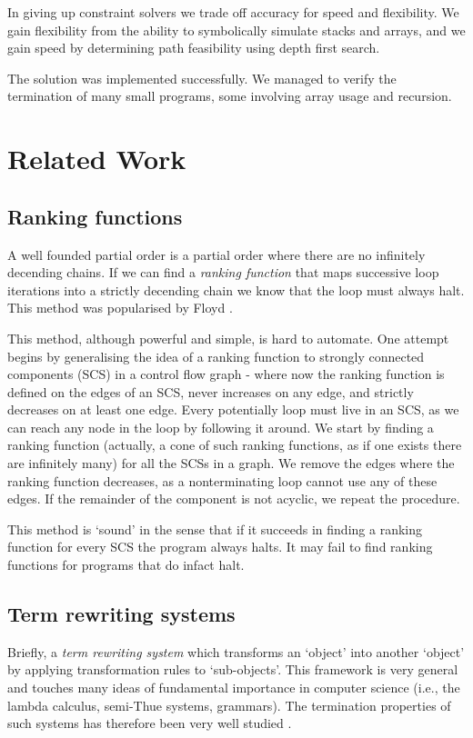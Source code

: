 \documentclass[12pt,a4paper]{article}
\begin{document}
In giving up constraint solvers we trade off accuracy for speed and flexibility.
We gain flexibility from the ability to symbolically simulate stacks and arrays, and we gain speed by determining path feasibility using depth first search.

The solution was implemented successfully. We managed to verify the termination of many small programs, some involving array usage and recursion.

\section{Related Work}
\subsection{Ranking functions}
A well founded partial order is a partial order where there are no infinitely decending chains. If we can find a \emph{ranking function} that maps successive loop iterations into a strictly decending chain we know that the loop must always halt.
This method was popularised by Floyd \citep{floyd}.

This method, although powerful and simple, is hard to automate. One attempt \citep{colon} begins by generalising the idea of a ranking function to strongly connected components (SCS) in a control flow graph - where now the ranking function is defined on the edges of an SCS, never increases on any edge, and strictly decreases on at least one edge. Every potentially loop must live in an SCS, as we can reach any node in the loop by following it around. We start by finding a ranking function (actually, a cone of such ranking functions, as if one exists there are infinitely many) for all the SCSs in a graph. We remove the edges where the ranking function decreases, as a nonterminating loop cannot use any of these edges. If the remainder of the component is not acyclic, we repeat the procedure.

This method is `sound' in the sense that if it succeeds in finding a ranking function for every SCS the program always halts. It may fail to find ranking functions
for programs that do infact halt.

\subsection{Term rewriting systems}
Briefly, a \emph{term rewriting system} which transforms an `object' into another `object' by applying transformation rules to `sub-objects'. This framework is very general and touches many ideas of fundamental importance in computer science (i.e., the lambda calculus, semi-Thue systems, grammars). The termination properties of such systems has therefore been very well studied \cite[p.~181]{zantema}.
\end{document}
